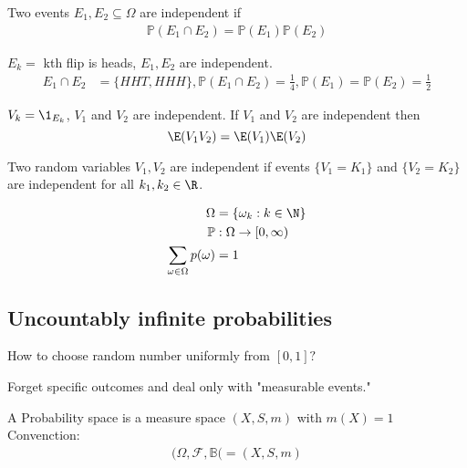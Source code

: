 Two events $E_1, E_2 \subseteq \Omega$ are independent if 
\begin{align*}
	\mathbb{P} (E_1 \cap E_2 ) = \mathbb{P} (E_1) \mathbb{P} (E_2)
\end{align*} 

\begin{example}
	$E_k =$ kth flip is heads, $E_1, E_2$ are independent.
	\begin{align*}
		E_1 \cap E_2 &= \{ HHT, HHH\}, \mathbb{P}(E_1 \cap E_2 ) = \frac{1}{4}, \mathbb{P}(E_1) = \mathbb{P}(E_2) = \frac{1}{2}
	\end{align*} 
\end{example}

\begin{example}
	$V_k = \1_{E_k}$, $V_1$ and $V_2$ are independent.
	If $V_1$ and $V_2$ are independent then 
	\[
		\E(V_1 V_2) = \E(V_1) \E(V_2)
	\] 
\end{example}


Two random variables $V_1, V_2$ are independent if events $\{V_1 = K_1 \}$ and $\{V_2 = K_2 \}$ 
are independent for all $k_1 , k_2 \in \R$.

\begin{definition}
	\begin{align*}
		\Omega &= \{ \omega_k : k \in \N \} \\
		\mathbb{P} &: \Omega \to [0,\infty) \\
		\sum_{\omega \in \Omega} p(\omega) &= 1
	\end{align*}
\end{definition}


\subsection{Uncountably infinite probabilities}

How to choose random number uniformly from $[0,1]?$

\begin{definition}[Kolmogorov]
	Forget specific outcomes and deal only with "measurable events."
	
\end{definition}

\begin{definition}
	A Probability space is a measure space $(X,S, m)$ with $m(X)=1$
	Convenction:
	\begin{align*}
		(\Omega, \mathcal{F}, \mathbb{B}( = (X,S, m)
	\end{align*} 
\end{definition}

